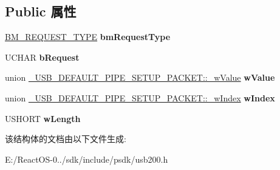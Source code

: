 \subsection*{Public 属性}
\begin{DoxyCompactItemize}
\item 
\mbox{\label{struct___u_s_b___d_e_f_a_u_l_t___p_i_p_e___s_e_t_u_p___p_a_c_k_e_t_aac04761cc9ea71ef2152e98fa4882b3c}} 
\hyperlink{union___b_m___r_e_q_u_e_s_t___t_y_p_e}{B\+M\+\_\+\+R\+E\+Q\+U\+E\+S\+T\+\_\+\+T\+Y\+PE} {\bfseries bm\+Request\+Type}
\item 
\mbox{\label{struct___u_s_b___d_e_f_a_u_l_t___p_i_p_e___s_e_t_u_p___p_a_c_k_e_t_a8231b77c33ba208c4a3f37d2a63d5672}} 
U\+C\+H\+AR {\bfseries b\+Request}
\item 
\mbox{\label{struct___u_s_b___d_e_f_a_u_l_t___p_i_p_e___s_e_t_u_p___p_a_c_k_e_t_a90a5f747478046e7d193e6fd19b8d639}} 
union \hyperlink{union___u_s_b___d_e_f_a_u_l_t___p_i_p_e___s_e_t_u_p___p_a_c_k_e_t_1_1__w_value}{\+\_\+\+U\+S\+B\+\_\+\+D\+E\+F\+A\+U\+L\+T\+\_\+\+P\+I\+P\+E\+\_\+\+S\+E\+T\+U\+P\+\_\+\+P\+A\+C\+K\+E\+T\+::\+\_\+w\+Value} {\bfseries w\+Value}
\item 
\mbox{\label{struct___u_s_b___d_e_f_a_u_l_t___p_i_p_e___s_e_t_u_p___p_a_c_k_e_t_a758716ae94fe757878189db69bba9fb9}} 
union \hyperlink{union___u_s_b___d_e_f_a_u_l_t___p_i_p_e___s_e_t_u_p___p_a_c_k_e_t_1_1__w_index}{\+\_\+\+U\+S\+B\+\_\+\+D\+E\+F\+A\+U\+L\+T\+\_\+\+P\+I\+P\+E\+\_\+\+S\+E\+T\+U\+P\+\_\+\+P\+A\+C\+K\+E\+T\+::\+\_\+w\+Index} {\bfseries w\+Index}
\item 
\mbox{\label{struct___u_s_b___d_e_f_a_u_l_t___p_i_p_e___s_e_t_u_p___p_a_c_k_e_t_a6d3b948082f9ee85df8220008fc36553}} 
U\+S\+H\+O\+RT {\bfseries w\+Length}
\end{DoxyCompactItemize}


该结构体的文档由以下文件生成\+:\begin{DoxyCompactItemize}
\item 
E\+:/\+React\+O\+S-\/0../sdk/include/psdk/usb200.\+h\end{DoxyCompactItemize}
